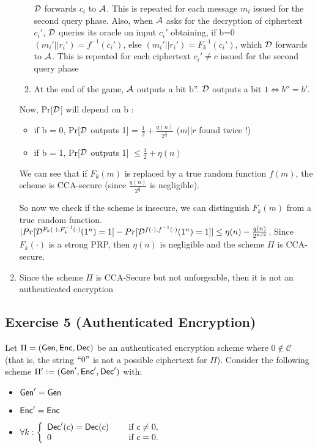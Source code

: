 \begin{solution}
\begin{enumerate}
\begin{enumerate}
        $\mathcal{D}$ forwards $c_i$ to $\mathcal{A}$. This is repeated for each message $m_i$ issued for the second query phase.
        \newline Also, when $\mathcal{A}$ asks for the decryption of ciphertext $c_i'$, $\mathcal{D}$ queries its oracle on input $c_i'$ obtaining, if b=0 $(m_i'||r_i') = f^{-1}(c_i')$, else $(m_i'||r_i') = F^{-1}_k(c_i')$, which $\mathcal{D}$ forwards to $\mathcal{A}$. This is repeated for each ciphertext $c_i' \neq c$ issued for the second query phase
        \item At the end of the game, $\mathcal{A}$ outputs a bit b''. $\mathcal{D}$ outputs a bit $1 \Leftrightarrow b'' = b'$. 
    \end{enumerate}
    Now, Pr[$\mathcal{D}$] will depend on b : 
    \begin{itemize}
        \item if b = 0, Pr[$\mathcal{D}$ outputs 1] = $\frac{1}{2} + \frac{q(n)}{2^{\frac{n}{2}}}$ ($m||r$ found twice !)
        \item if b = 1, Pr[$\mathcal{D}$ outputs 1] $\leq \frac{1}{2} + \eta(n)$
    \end{itemize}
    We can see that if $F_k(m)$ is replaced by a true random function $f(m)$, the scheme is CCA-secure (since $\frac{q(n)}{2^{\frac{n}{2}}}$ is negligible). 
    
    So now we check if the scheme is insecure, we can distinguish $F_k(m)$ from a true random function. $|Pr[\mathcal{D}^{F_k(\cdot),F_k^{-1}(\cdot)}(1^n)=1]-Pr[\mathcal{D}^{f(\cdot),f^{-1}(\cdot)}(1^n)=1]| \leq \eta(n) - \frac{q(n)}{2^{n/2}}$. Since $F_k(\cdot)$ is a strong PRP, then $\eta(n)$ is negligible and the scheme $\Pi$ is CCA-secure.
    \item Since the scheme $\Pi$ is CCA-Secure but not unforgeable, then it is not an authenticated encryption
\end{enumerate}
\end{solution}


\subsection{Exercise 5 (Authenticated Encryption)}
Let $\Pi=(\operatorname{\mathsf{Gen}},\operatorname{\mathsf{Enc}},\operatorname{\mathsf{Dec}})$ be an authenticated encryption scheme where $ 0 \not \in \mathcal{C}$ (that is, the string $``0"$ is not a possible ciphertext for $\Pi$). Consider the following scheme $\Pi':=(\operatorname{\mathsf{Gen}}',\operatorname{\mathsf{Enc}}',\operatorname{\mathsf{Dec}}')$ with:

\begin{itemize}
\item $\operatorname{\mathsf{Gen}}'=\operatorname{\mathsf{Gen}}$
\item $\operatorname{\mathsf{Enc}}'=\operatorname{\mathsf{Enc}}$
\item 	$ \forall k: \left\{ 	\begin{array}{l l}
\operatorname{\mathsf{Dec}}'(c)=\operatorname{\mathsf{Dec}}(c) &\quad \text{ if } c \neq 0,\\
 0 &\quad  \text{ if } c = 0. 
\end{array} \right.   $ 
\end{itemize}


